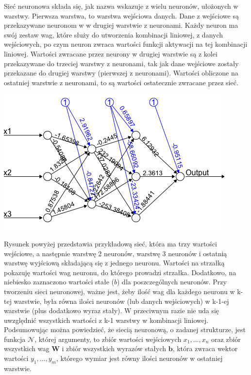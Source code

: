 \documentclass[licencjacka]{pracamgr}
\begin{document}
Sieć neuronowa składa się, jak nazwa wskazuje z wielu neuronów, ułożonych w warstwy. Pierwsza warstwa, to warstwa wejściowa danych. Dane z wejściowe są przekazywane neuronom w w drugiej warstwie z neuronami. Każdy neuron ma swój zestaw wag, które służy do utworzenia kombinacji liniowej, z danych wejściowych, po czym neuron zwraca wartości funkcji aktywacji na tej kombinacji liniowej. Wartości zwracane przez neurony w drugiej warstwie są z kolei przekazywane do trzeciej warstwy z neuronami, tak jak dane wejściowe zostały przekazane do drugiej warstwy (pierwszej z neuronami).  Wartości obliczone na ostatniej warstwie z neuronami, to są wartości ostatecznie zwracane przez sieć. 

\begin{flushleft}
	\includegraphics [scale=0.7]{nn_example.png}
\end{flushleft}

Rysunek powyżej przedstawia przykładową sieć, która ma trzy wartości wejściowe, a następnie warstwę 2 neuronów, warstwę 3 neuronów i ostatnią warstwę wyjściową składającą się z jednego neuronu. Wartości na strzałką pokazuję wartości wag neuronu, do którego prowadzi strzałka. Dodatkowo, na niebiesko zaznaczono wartości stałe ($b$) dla poszczególnych neuronów. Przy tworzeniu sieci neuronowej, ważne jest, żeby ilość wag dla każdego neuronu w k-tej warstwie, była równa ilości neuronów (lub danych wejściowych) w k-1-ej warstwie (plus dodatkowo wyraz stały). W przeciwnym razie nie uda się uwzględnić wszystkich wartości z k-1 warstwy w kombinacji liniowej.  \\
 
Podsumowując można powiedzieć, że siecią neuronową, o zadanej strukturze, jest funkcja $\mathbf{\mathcal{N}}$, której argumenty, to zbiór wartości wejściowych $x_{1},...,x_{n}$ oraz zbiór wszystkich wag $\mathbf{W}$ i zbiór wszystkich wyrazów stałych $\mathbf{b}$, która zwraca wektor wartości $y_{1},...,y_{m}$, którego wymiar jest równy ilości neuronów w ostatniej warstwie.
\end{document}
